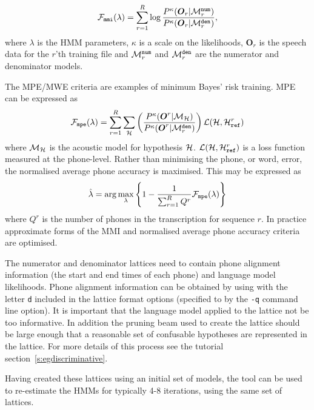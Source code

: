 \newcommand{\num}{{{\tt num}}}
\newcommand{\den}{{{\tt den}}}
\newcommand{\MMI}{{\tt{mmi}}}
\newcommand{\calO}{ {\bm O} }
\newcommand{\calM}{ {\cal M} }

\begin{equation}
    {\cal F}_\MMI(\lambda) = \sum_{r=1}^R\log \frac { P^\kappa(\calO_r | \calM^\num_r) } { P^\kappa(\calO_r | \calM^\den_r) },
  \label{eq:mmimodels}
\end{equation}
where $\lambda$ is the HMM parameters,  $\kappa$ is a scale on the likelihoods, $\calO_r$ is the
speech data for the $r$'th training file and $\calM^\num_r$ and $\calM^\den_r$ are the numerator
and denominator models.  

The MPE/MWE criteria are examples of minimum Bayes' risk training. MPE can be expressed as
\begin{eqnarray}
{\cal F}_{\tt mpe}(\lambda) = \sum_{r=1}^R\sum_{\cal H}
\left(\frac{P^\kappa({\mbox{\boldmath $O$}}^r|{\cal M}_{\cal H})}
{P^\kappa({\mbox{\boldmath $O$}}^r|{\cal M}^{\tt den}_r)}\right)
{\cal L}({\cal H},{\cal H}^r_{\tt ref})
\end{eqnarray}
where ${\cal M}_{\cal H}$ is the acoustic model for hypothesis
${\cal H}$. ${\cal L}({\cal H},{\cal H}^r_{\tt ref})$ is a loss function
measured at the phone-level. Rather than minimising the phone, or word, error,
the normalised average phone accuracy 
is maximised. This may be expressed as
\begin{eqnarray}
{\hat{\lambda}} = \arg\max_{\lambda}\left\{
1 - \frac{1}{\sum_{r=1}^RQ^r}{\cal F}_{\tt mpe}(\lambda)
\right\}
\end{eqnarray}
where $Q^r$ is the number of phones in the transcription for sequence $r$.
In practice approximate forms of the MMI and normalised average phone accuracy
criteria are optimised. 

The numerator and denominator lattices need to contain phone alignment information
(the start and end times of each phone) and language model likelihoods.
Phone alignment information can be obtained by using  with
the letter \texttt{d} included in the lattice format options (specified to  by the
\texttt{-q} command line option).  It is important that the language model
applied to the lattice not be too informative. In addition the
pruning beam used to create the lattice should  be large enough that a
reasonable set of confusable hypotheses are represented in the lattice. For
more details of this process see the tutorial
section~\ref{s:egdiscriminative}. 

Having created these lattices using an initial set of models, the
tool  can be used to re-estimate the HMMs for 
typically 4-8 iterations, using the same set of lattices.   

